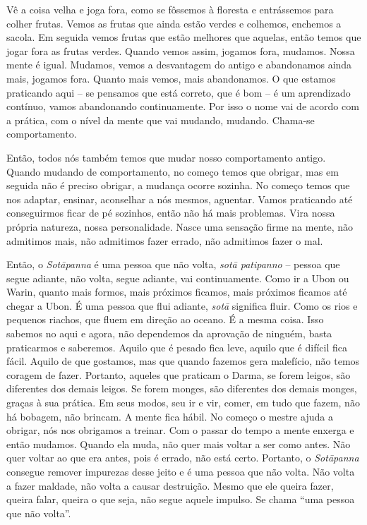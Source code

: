 Vê a coisa velha e joga fora, como se fôssemos à floresta e
entrássemos para colher frutas. Vemos as frutas que ainda estão verdes
e colhemos, enchemos a sacola. Em seguida vemos frutas que estão
melhores que aquelas, então temos que jogar fora as frutas verdes.
Quando vemos assim, jogamos fora, mudamos. Nossa mente é igual.
Mudamos, vemos a desvantagem do antigo e abandonamos ainda mais,
jogamos fora. Quanto mais vemos, mais abandonamos. O que estamos
praticando aqui – se pensamos que está correto, que é bom – é um
aprendizado contínuo, vamos abandonando continuamente. Por isso o nome
vai de acordo com a prática, com o nível da mente que vai mudando,
mudando. Chama-se comportamento. 

Então, todos nós também temos que mudar nosso comportamento antigo.
Quando mudando de comportamento, no começo temos que obrigar, mas em
seguida não é preciso obrigar, a mudança ocorre sozinha. No começo
temos que nos adaptar, ensinar, aconselhar a nós mesmos, aguentar.
Vamos praticando até conseguirmos ficar de pé sozinhos, então não há
mais problemas. Vira nossa própria natureza, nossa personalidade. Nasce
uma sensação firme na mente, não admitimos mais, não admitimos fazer
errado, não admitimos fazer o mal. 

Então, o \textit{Sotāpanna} é uma pessoa que não volta,
\textit{sotā patipanno} – pessoa que segue adiante, não volta, segue
adiante, vai continuamente. Como ir a Ubon ou Warin, quanto mais
formos, mais próximos ficamos, mais próximos ficamos até chegar a Ubon.
É uma pessoa que flui adiante, \textit{sotā} significa fluir. Como os
rios e pequenos riachos, que fluem em direção ao oceano. É a mesma
coisa. Isso sabemos no aqui e agora, não dependemos da aprovação de
ninguém, basta praticarmos e saberemos. Aquilo que é pesado fica leve,
aquilo que é difícil fica fácil. Aquilo de que gostamos, mas que quando
fazemos gera malefício, não temos coragem de fazer. Portanto, aqueles
que praticam o Darma, se forem leigos, são diferentes dos demais
leigos. Se forem monges, são diferentes dos demais monges, graças à sua
prática. Em seus modos, seu ir e vir, comer, em tudo que fazem, não há
bobagem, não brincam. A mente fica hábil. No começo o mestre ajuda a
obrigar, nós nos obrigamos a treinar. Com o passar do tempo a mente
enxerga e então mudamos. Quando ela muda, não quer mais voltar a ser
como antes. Não quer voltar ao que era antes, pois é errado, não está
certo. Portanto, o \textit{Sotāpanna} consegue remover impurezas
desse jeito e é uma pessoa que não volta. Não volta a fazer maldade,
não volta a causar destruição. Mesmo que ele queira fazer, queira
falar, queira o que seja, não segue aquele impulso. Se chama “uma
pessoa que não volta”. 

